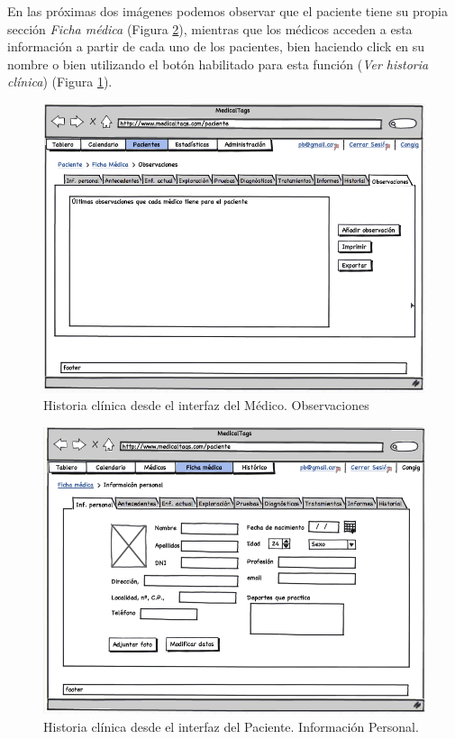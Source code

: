 		En las próximas dos imágenes podemos observar que el paciente tiene su propia sección \textit{Ficha médica} (Figura \ref{fig:iu_hc_paciente}), mientras que los médicos acceden a esta información a partir de cada uno de los pacientes, bien haciendo click en su nombre o bien utilizando el botón habilitado para esta función (\textit{Ver historia clínica}) (Figura \ref{fig:iu_hc_medico}).
		
		\begin{figure}[H]
		  \centering
		    \includegraphics[width=12cm]{img/png/interfaz/29_1_Historial_Medico.png}
		  \caption{Historia clínica desde el interfaz del Médico. Observaciones}
		  \label{fig:iu_hc_medico}
		\end{figure}
		
		\begin{figure}[H]
		  \centering
		    \includegraphics[width=12cm]{img/png/interfaz/29_Historial_Paciente.png}
		  \caption{Historia clínica desde el interfaz del Paciente. Información Personal.}
		  \label{fig:iu_hc_paciente}
		\end{figure}
		
